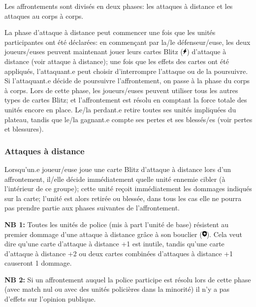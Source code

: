 \documentclass[a4paper,13pt]{scrartcl}
\begin{document}
Les affrontements sont divisés en deux phases: les attaques à distance et les attaques au corps à corps.

La phase d'attaque à distance peut commencer une fois que les unités participantes ont été déclarées: en commençant par la/le défenseur/euse, les deux joueurs/euses peuvent maintenant jouer leurs cartes Blitz (\includegraphics[height=9pt]{blitz.png}) d'attaque à distance (voir attaque à distance); une fois que les effets des cartes ont été appliqués, l'attaquant.e peut choisir d'interrompre l'attaque ou de la poursuivre.
Si l'attaquant.e décide de poursuivre l'affrontement, on passe à la phase du corps à corps.
Lors de cette phase, les joueurs/euses peuvent utiliser tous les autres types de cartes Blitz; et l'affrontement est résolu en comptant la force totale des unités encore en place.
Le/la perdant.e retire toutes ses unités impliquées du plateau, tandis que le/la gagnant.e compte ses pertes et ses blessés/es (voir pertes et blessures).

\subsubsection*{Attaques à distance}
Lorsqu'un.e joueur/euse joue une carte Blitz d'attaque à distance lors d'un affrontement, il/elle décide immédiatement quelle unité ennemie cibler (à l'intérieur de ce groupe); cette unité reçoit immédiatement les dommages indiqués sur la carte; l'unité est alors retirée ou blessée, dans tous les cas elle ne pourra pas prendre partie aux phases suivantes de l'affrontement.

\textbf{NB 1:} Toutes les unités de police (mis à part l'unité de base) résistent au premier dommage d'une attaque à distance grâce à son bouclier (\includegraphics[height=9pt]{shield.png}).
Cela veut dire qu'une carte d'attaque à distance +1 est inutile, tandis qu'une carte d'attaque à distance +2 ou deux cartes combinées d'attaques à distance +1 causeront 1 dommage.

\textbf{NB 2:} Si un affrontement auquel la police participe est résolu lors de cette phase (avec match nul ou avec des unités policières dans la minorité) il n'y a pas d'effets sur l'opinion publique.
\end{document}
